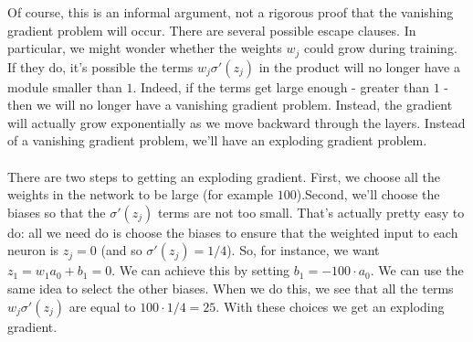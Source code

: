Of course, this is an informal argument, not a rigorous proof that the vanishing gradient problem will occur. There are several possible escape clauses. In particular, we might wonder whether the weights $w_j$ could grow during training. If they do, it's possible the terms $w_j\sigma'(z_j)$ in the product will no longer have a module smaller than $1$. Indeed, if the terms get large enough - greater than $1$ - then we will no longer have a vanishing gradient problem. Instead, the gradient will actually grow exponentially as we move backward through the layers. Instead of a vanishing gradient problem, we'll have an exploding gradient problem.

\paragraph{} There are two steps to getting an exploding gradient. First, we choose all the weights in the network to be large (for example $100$).Second, we'll choose the biases so that the $\sigma'(z_j)$ terms are not too small. That's actually pretty easy to do: all we need do is choose the biases to ensure that the weighted input to each neuron is $z_j=0$ (and so $\sigma'(z_j)=1/4$). So, for instance, we want $z_1=w_1a_0+b_1=0$. We can achieve this by setting $b_1=-100\cdot a_0$. We can use the same idea to select the other biases. When we do this, we see that all the terms $w_j\sigma'(z_j)$ are equal to $100\cdot 1/4=25$. With these choices we get an exploding gradient.

